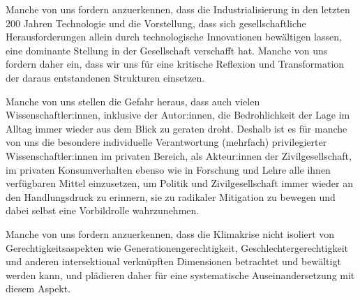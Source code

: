 \documentclass[DIV=12]{scrartcl}
\begin{document}
Manche von uns fordern anzuerkennen, dass die Industrialisierung in den
letzten 200 Jahren Technologie und die Vorstellung, dass sich
gesellschaftliche Herausforderungen allein durch technologische
Innovationen bewältigen lassen, eine dominante Stellung in der
Gesellschaft verschafft hat. Manche von uns fordern daher ein, dass wir
uns für eine kritische Reflexion und Transformation der daraus
entstandenen Strukturen einsetzen.

Manche von uns stellen die Gefahr heraus, dass auch vielen
Wissenschaftler:innen, inklusive der Autor:innen, die Bedrohlichkeit der
Lage im Alltag immer wieder aus dem Blick zu geraten droht. Deshalb ist
es für manche von uns die besondere individuelle Verantwortung
(mehrfach) privilegierter Wissenschaftler:innen im privaten Bereich, als
Akteur:innen der Zivilgesellschaft, im privaten Konsumverhalten ebenso
wie in Forschung und Lehre alle ihnen verfügbaren Mittel einzusetzen, um
Politik und Zivilgesellschaft immer wieder an den Handlungsdruck zu
erinnern, sie zu radikaler Mitigation zu bewegen und dabei selbst eine
Vorbildrolle wahrzunehmen.

Manche von uns fordern anzuerkennen, dass die Klimakrise nicht isoliert
von Gerechtigkeitsaspekten wie Generationengerechtigkeit,
Geschlechtergerechtigkeit und anderen intersektional verknüpften
Dimensionen betrachtet und bewältigt werden kann, und plädieren daher
für eine systematische Auseinandersetzung mit diesem Aspekt.

\begin{flushright}
\end{flushright}
\end{document}
